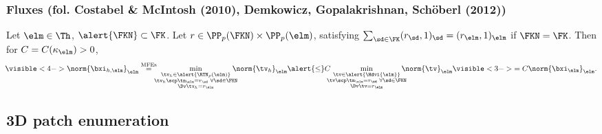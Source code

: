 \documentclass[compress]{beamer}
\begin{document}
\begin{frame}
\frametitle{Fluxes (fol. {\scriptsize Costabel \& McIntosh (2010), Demkowicz,
Gopalakrishnan, Sch{\"o}berl (2012)})}

 Let $\elm \in \Th$,
$\alert{\FKN} \subset \FK$. Let $r \in \PP_{p}(\FKN) \times \PP_{p}(\elm)$,
satisfying $\sum_{\sd \in \FK}(r_\sd,1)_\sd = (r_\elm,1)_\elm$ if $\FKN =
\FK$. Then for $C=C(\kappa_{\elm}) > 0$,
%
\[
    \!\visible<4->{\norm{\bxi_{h,\elm}}_\elm \stackrel{\text{MFEs}}{=}}\!\!\!\min_{\substack{\tv_h \in \alert{\RTN_p(\elm)}\\
    \tv_h \scp \tn_\elm = r_\sd \,\, \forall \sd \in \FKN\\
    \Dv \tv_h = r_\elm}} \!\!\!\!\! \norm{\tv_h}_\elm \alert{\leq} C
    \!\!\!\! \min_{\substack{\tv \in \alert{\Hdvi{\elm}}\\
    \tv \scp \tn_\elm = r_\sd \,\, \forall \sd \in \FKN\\
    \Dv \tv = r_\elm}} \!\!\!\!\!
    \norm{\tv}_\elm \visible<3->{=C \norm{\bxi_\elm}_\elm}.
\]
%
\el


\end{frame}

\subsection{3D patch enumeration}
\end{document}
